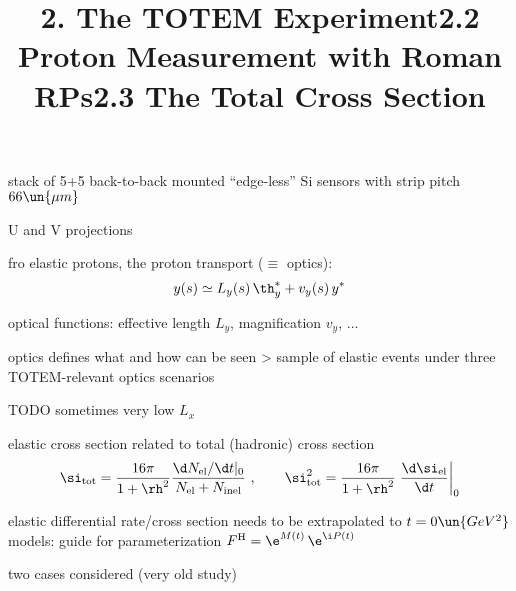
\> stack of 5+5 back-to-back mounted ``edge-less'' Si sensors with strip pitch $66\un{\mu m}$

\> U and V projections


\newpage%
\title{2. The TOTEM Experiment\hfill 2.2 Proton Measurement with Roman RPs}


\> fro elastic protons, the proton transport ($\equiv$ optics):
$$y(s) \simeq L_y(s)\, \th_y^* + v_y(s)\, y^*$$

\> optical functions: effective length $L_y$, magnification $v_y$, ...

\> optics defines what and how can be seen
\>> sample of elastic events under three TOTEM-relevant optics scenarios


\> TODO sometimes very low $L_x$


\newpage%
\title{2.3 The Total Cross Section}




\> elastic cross section related to total (hadronic) cross section
$$
	\si_{\rm tot} = {16\pi\over 1+\rh^2} {\d N_{\rm el}/\d t |_0 \over N_{\rm el} + N_{\rm inel}}\ ,\qquad
	\si_{\rm tot}^2 = {16\pi\over 1+\rh^2} \left. {\d\si_{\rm el}\over\d t} \right|_0
$$

\> elastic differential rate/cross section needs to be extrapolated to $t=0\un{GeV^2}$
\> models: guide for parameterization $F^{\rm H} = \e^{M(t)}\, \e^{\i P(t)}$

\> two cases considered (very old study)



